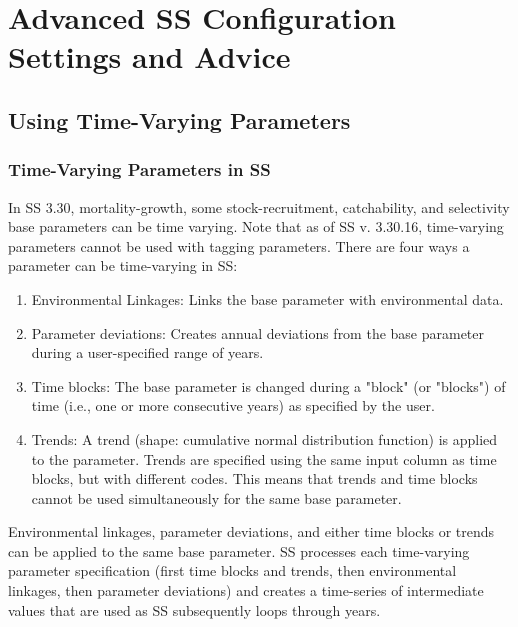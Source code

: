 \section{Advanced SS Configuration Settings and Advice}

\hypertarget{TVpara}{}
\subsection{Using Time-Varying Parameters}

\hypertarget{tvOrder}{}
\subsubsection{Time-Varying Parameters in SS}

In SS 3.30, mortality-growth, some stock-recruitment, catchability, and selectivity base parameters can be time varying. Note that as of SS v. 3.30.16, time-varying parameters cannot be used with tagging parameters. There are four ways a parameter can be time-varying in SS:
\begin{enumerate}
    \item Environmental Linkages: Links the base parameter with environmental data.
	\item Parameter deviations: Creates annual deviations from the base parameter during a user-specified range of years.
	\item Time blocks: The base parameter is changed during a "block" (or "blocks") of time (i.e., one or more consecutive years) as specified by the user.
	\item Trends: A trend (shape: cumulative normal distribution function) is applied to the parameter. Trends are specified using the same input column as time blocks, but with different codes. This means that trends and time blocks cannot be used simultaneously for the same base parameter.
\end{enumerate}

Environmental linkages, parameter deviations, and either time blocks or trends can be applied to the same base parameter. SS processes each time-varying parameter specification (first time blocks and trends, then environmental linkages, then parameter deviations) and creates a time-series of intermediate values that are used as SS subsequently loops through years.



\hypertarget{tvgrowth}{}
